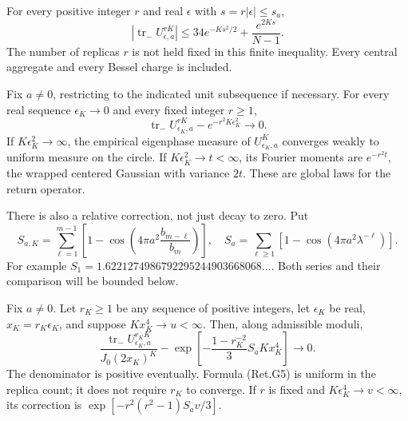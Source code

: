 \begin{theorem}\label{pass1:return_gas-1} For every positive integer \(r\)
and real \(\epsilon\) with \(s=r|\epsilon|\le s_a\),
\[
 |\operatorname{tr}_-U_{\epsilon,a}^{rK}|
 \le34e^{-Ks^2/2}+\frac{e^{2Ks}}{N-1}.                      \tag{Ret.G2}
\]
The number of replicas \(r\) is not held fixed in this finite inequality.
Every central aggregate and every Bessel charge is included.
\end{theorem}

\begin{corollary}\label{pass1:return_gas-2}
Fix \(a\ne0\), restricting to the indicated unit subsequence if necessary.
For every real sequence \(\epsilon_K\to0\) and every fixed integer \(r\ge1\),
\[
 \operatorname{tr}_-U_{\epsilon_K,a}^{rK}
                    -e^{-r^2K\epsilon_K^2}\longrightarrow0. \tag{Ret.G3}
\]
If \(K\epsilon_K^2\to\infty\), the empirical eigenphase measure of
\(U_{\epsilon_K,a}^K\) converges weakly to uniform measure on the circle.
If \(K\epsilon_K^2\to t<\infty\), its Fourier moments are \(e^{-r^2t}\),
the wrapped centered Gaussian with variance \(2t\).
These are global laws for the return operator.
\end{corollary}

There is also a relative correction, not just decay to zero.
Put
\[
 S_{a,K}=\sum_{\ell=1}^{m-1}
       \left[1-\cos\left(4\pi a^2\frac{b_{m-\ell}}{b_m}\right)\right],
 \quad
 S_a=\sum_{\ell\ge1}[1-\cos(4\pi a^2\lambda^{-\ell})].        \tag{Ret.G4}
\]
For example \(S_1=1.6221274986792295244903668068\ldots\).
Both series and their comparison will be bounded below.

\begin{theorem}\label{pass1:return_gas-3}
Fix \(a\ne0\). Let \(r_K\ge1\) be any sequence of positive integers,
let \(\epsilon_K\) be real,
\(x_K=r_K\epsilon_K\), and suppose \(Kx_K^4\to u<\infty\).
Then, along admissible moduli,
\[
 \frac{\operatorname{tr}_-U_{\epsilon_K,a}^{r_KK}}
                   {J_0(2x_K)^K}
 -
 \exp\left[-\frac{1-r_K^{-2}}3 S_a Kx_K^4\right]
                         \longrightarrow0.                 \tag{Ret.G5}
\]
The denominator is positive eventually. Formula (Ret.G5) is uniform in the
replica count; it does not require \(r_K\) to converge.
If \(r\) is fixed and \(K\epsilon_K^4\to v<\infty\), its correction is
\(\exp[-r^2(r^2-1)S_av/3]\).
\end{theorem}

